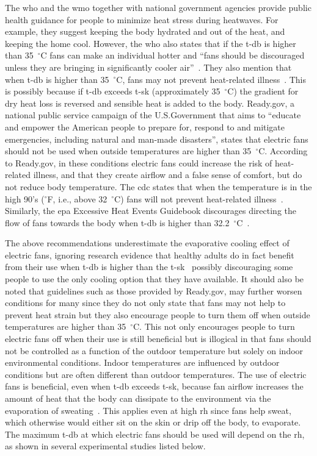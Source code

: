 The \ac{who} and the \ac{wmo} together with national government agencies provide public health guidance for people to minimize heat stress during heatwaves.
For example, they suggest keeping the body hydrated and out of the heat, and keeping the home cool.
However, the \ac{who} also states that if the \ac{t-db} is higher than 35~$^{\circ}$C fans can make an individual hotter and ``fans should be discouraged unless they are bringing in significantly cooler air''~\cite{WMO2015}.
They also mention that when \ac{t-db} is higher than 35~$^{\circ}$C, fans may not prevent heat-related illness~\cite{HeatandH28:online}.
This is possibly because if \ac{t-db} exceeds \ac{t-sk} (approximately 35~$^{\circ}$C) the gradient for dry heat loss is reversed and sensible heat is added to the body.
Ready.gov, a national public service campaign of the U.S.\@ Government that aims to ``educate and empower the American people to prepare for, respond to and mitigate emergencies, including natural and man-made disasters'', states that electric fans should not be used when outside temperatures are higher than 35~$^{\circ}$C\@.
According to Ready.gov, in these conditions electric fans could increase the risk of heat-related illness, and that they create airflow and a false sense of comfort, but do not reduce body temperature.
The \ac{cdc} states that when the temperature is in the high 90's ($^{\circ}$F, i.e., above 32~$^{\circ}$C) fans will not prevent heat-related illness~\cite{ExtremeH66:online}.
Similarly, the \ac{epa} Excessive Heat Events Guidebook discourages directing the flow of fans towards the body when \ac{t-db} is higher than 32.2~$^{\circ}$C~\cite{UnitedStatesEnvironmentalProtectionAgency2006}.

The above recommendations underestimate the evaporative cooling effect of electric fans, ignoring research evidence that healthy adults do in fact benefit from their use when \ac{t-db} is higher than the \ac{t-sk}~\cite{Jay2019a, Rate2015, Jay2015, Gagnon2017} possibly discouraging some people to use the only cooling option that they have available.
It should also be noted that guidelines such as those provided by Ready.gov, may further worsen conditions for many since they do not only state that fans may not help to prevent heat strain but they also encourage people to turn them off when outside temperatures are higher than 35~$^{\circ}$C\@.
This not only encourages people to turn electric fans off when their use is still beneficial but is illogical in that fans should not be controlled as a function of the outdoor temperature but solely on indoor environmental conditions. 
Indoor temperatures are influenced by outdoor conditions but are often different than outdoor temperatures. 
The use of electric fans is beneficial, even when \ac{t-db} exceeds \ac{t-sk}, because fan airflow increases the amount of heat that the body can dissipate to the environment via the evaporation of sweating~\cite{Jay2015}.
This applies even at high \ac{rh} since fans help sweat, which otherwise would either sit on the skin or drip off the body, to evaporate.
The maximum \ac{t-db} at which electric fans should be used will depend on the \ac{rh}, as shown in several experimental studies listed below.

